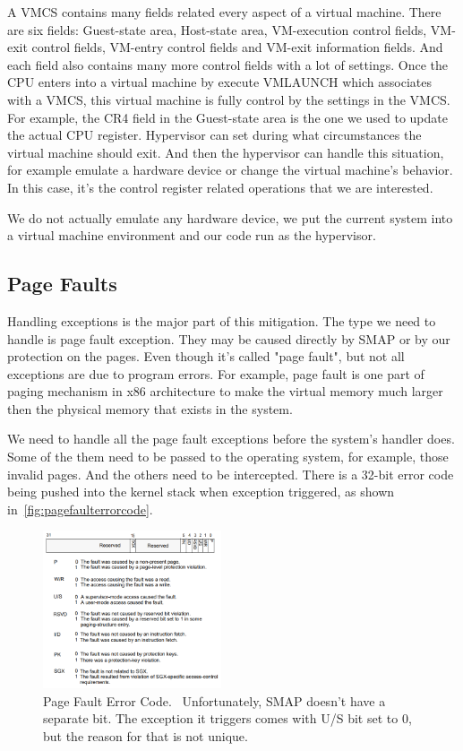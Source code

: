 A VMCS contains many fields related every aspect of a virtual machine. There are six fields: Guest-state area, Host-state area, VM-execution control fields, VM-exit control fields, VM-entry control fields and VM-exit information fields. And each field also contains many more control fields with a lot of settings. Once the CPU enters into a virtual machine by execute VMLAUNCH which associates with a VMCS, this virtual machine is fully control by the settings in the VMCS. For example, the CR4 field in the Guest-state area is the one we used to update the actual CPU register.  Hypervisor can set during what circumstances the virtual machine should exit. And then the hypervisor can handle this situation, for example emulate a hardware device or change the virtual machine's behavior. In this case, it's the control register related operations that we are interested. 

We do not actually emulate any hardware device, we put the current system into a virtual machine environment and our code run as the hypervisor.



\subsection{Page Faults}
Handling exceptions is the major part of this mitigation. The type we need to handle is page fault exception. They may be caused directly by SMAP or by our protection on the pages. Even though it's called "page fault", but not all exceptions are due to program errors. For example, page fault is one part of paging mechanism in x86 architecture to make the virtual memory much larger then the physical memory that exists in the system. 

We need to handle all the page fault exceptions before the system's handler does. Some of the them need to be passed to the operating system, for example, those invalid pages. And the others need to be intercepted. There is a 32-bit error code being pushed into the kernel stack when exception triggered, as shown in~\autoref{fig:pagefaulterrorcode}.


\begin{figure}[th]
  \includegraphics[width=0.47\textwidth]{figures/pagefaulterrorcode}
  \centering
  \caption{Page Fault Error Code.~\cite{intelinterrupt} Unfortunately, SMAP doesn't have a separate bit. The exception it triggers comes with U/S bit set to 0, but the reason for that is not unique.}
  \label{fig:pagefaulterrorcode}
\end{figure}

